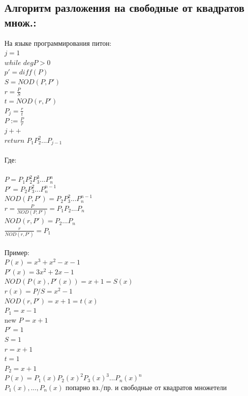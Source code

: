 \documentclass[12pt]{article}
\begin{document}
        \subsection{Алгоритм разложения на свободные от  квадратов множ.:}
        \noindent На языке программирования питон:
        \\$j=1$
    \\$while$ $deg P>0$
        \\$p' = diff(P)$
    \\$S=NOD(P,P')$
        \\$r = \frac{P}{S}$
    \\$t = NOD(r,P')$
        \\$P_j=\frac{r}{t}$
    \\$P:=\frac{P}{r}$
        \\$j++$
    \\$return$ $P_1P^2_2...P_{j-1}$
        \\
        \\Где:
        \\
        \\$P=P_1P^2_2P^3_3...P^n_n$
    \\$P'=P_2P^2_3...P_n^{n-1}$
        \\$NOD(P,P')=P_2P_3^2...P_n^{n-1}$
    \\$r=\frac{P}{NOD(P,P')}=P_1P_2...P_n$
        \\$NOD(r,P')=P_2...P_n$
    \\$\frac{r}{NOD(r,P')}=P_1$
        \\
        \\Пример:
        \\$P(x)=x^3+x^2-x-1$
    \\$P'(x)=3x^2+2x-1$
        \\$NOD(P(x),P'(x))=x+1=S(x)$
    \\$r(x)= P/S=x^2-1$
        \\$NOD(r,P')=x+1=t(x)$
    \\$P_1=x-1$
        \\new $P=x+1$
        \\$P'=1$
    \\$S=1$
        \\$r = x+1$
    \\$t = 1$
        \\$P_2=x+1$
    \\$P(x) = P_1(x)P_2(x)^2P_3(x)^3...P_n(x)^n$
        \\$P_1(x),...,P_n(x)$ попарно вз./пр. и свободные от квадратов множетели
\end{document}
